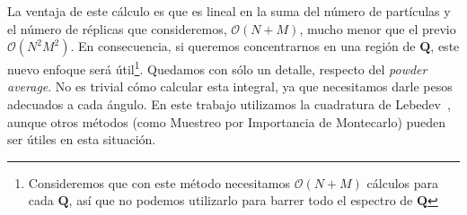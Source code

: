 La ventaja de este cálculo es que es lineal en la suma del número de partículas y el número de réplicas que consideremos, $\mathcal{O}(N+M)$, mucho menor que el previo $\mathcal{O}(N^2M^2)$.
En consecuencia, si queremos concentrarnos en una región de $\mathbf{Q}$, este nuevo enfoque será útil\footnote{Consideremos que con este método necesitamos $\mathcal{O}(N+M)$ cálculos para cada $\mathbf{Q}$, así que no podemos utilizarlo para barrer todo el espectro de $\mathbf{Q}$}.
Quedamos con sólo un detalle, respecto del \emph{powder average}.
No es trivial cómo calcular esta integral, ya que necesitamos darle pesos adecuados a cada ángulo.
En este trabajo utilizamos la cuadratura de Lebedev~\cite{lebedev_values_1975}, aunque otros métodos (como Muestreo por Importancia de Montecarlo) pueden ser útiles en esta situación.